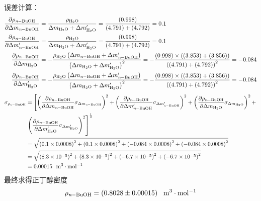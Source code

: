 \documentclass[cn,hazy,pku,12pt,normal,math=newtx,cite=super]{elegantnote}
\begin{document}
误差计算：
\begin{equation*}
\begin{aligned}
\frac{\partial \rho_{\ce{\textit{n}-BuOH}} }{\partial \Delta m_{\ce{\textit{n}-BuOH}} }&=\frac{\rho_{\ce{H_2O}}}{\Delta m_{\ce{H_2O}} + \Delta m_{\ce{H_2O}}^\prime}=\frac{\left(0.998\right)}{\left(4.791\right) + \left(4.792\right)}=0.1\\
\frac{\partial \rho_{\ce{\textit{n}-BuOH}} }{\partial \Delta m_{\ce{\textit{n}-BuOH}}^\prime }&=\frac{\rho_{\ce{H_2O}}}{\Delta m_{\ce{H_2O}} + \Delta m_{\ce{H_2O}}^\prime}=\frac{\left(0.998\right)}{\left(4.791\right) + \left(4.792\right)}=0.1\\
\frac{\partial \rho_{\ce{\textit{n}-BuOH}} }{\partial \Delta m_{\ce{H_2O}} }&=- \frac{\rho_{\ce{H_2O}} \left(\Delta m_{\ce{\textit{n}-BuOH}} + \Delta m_{\ce{\textit{n}-BuOH}}^\prime\right)}{\left(\Delta m_{\ce{H_2O}} + \Delta m_{\ce{H_2O}}^\prime\right)^{2}}=- \frac{\left(0.998\right) \times \left(\left(3.853\right) + \left(3.856\right)\right)}{\left(\left(4.791\right) + \left(4.792\right)\right)^{2}}=-0.084\\
\frac{\partial \rho_{\ce{\textit{n}-BuOH}} }{\partial \Delta m_{\ce{H_2O}}^\prime }&=- \frac{\rho_{\ce{H_2O}} \left(\Delta m_{\ce{\textit{n}-BuOH}} + \Delta m_{\ce{\textit{n}-BuOH}}^\prime\right)}{\left(\Delta m_{\ce{H_2O}} + \Delta m_{\ce{H_2O}}^\prime\right)^{2}}=- \frac{\left(0.998\right) \times \left(\left(3.853\right) + \left(3.856\right)\right)}{\left(\left(4.791\right) + \left(4.792\right)\right)^{2}}=-0.084\\
\end{aligned}
\end{equation*}
\begin{equation*}
\begin{aligned}
\sigma_{\rho_{\ce{\textit{n}-BuOH}}}&=\left[\left(\frac{\partial \rho_{\ce{\textit{n}-BuOH}} }{\partial \Delta m_{\ce{\textit{n}-BuOH}} } \sigma_{\Delta m_{\ce{\textit{n}-BuOH}}}\right)^2+\left(\frac{\partial \rho_{\ce{\textit{n}-BuOH}} }{\partial \Delta m_{\ce{\textit{n}-BuOH}}^\prime } \sigma_{\Delta m_{\ce{\textit{n}-BuOH}}^\prime}\right)^2+\left(\frac{\partial \rho_{\ce{\textit{n}-BuOH}} }{\partial \Delta m_{\ce{H_2O}} } \sigma_{\Delta m_{\ce{H_2O}}}\right)^2+\right.\\
& \left.\left(\frac{\partial \rho_{\ce{\textit{n}-BuOH}} }{\partial \Delta m_{\ce{H_2O}}^\prime } \sigma_{\Delta m_{\ce{H_2O}}^\prime}\right)^2\right]^{\frac12}\\  
&=\sqrt{\left(0.1 \times 0.0008\right)^2+\left(0.1 \times 0.0008\right)^2+\left(-0.084 \times 0.0008\right)^2+\left(-0.084 \times 0.0008\right)^2}\\
&=\sqrt{\left(8.3 \times 10^{-5}\right)^2+\left(8.3 \times 10^{-5}\right)^2+\left(-6.7 \times 10^{-5}\right)^2+\left(-6.7 \times 10^{-5}\right)^2}\\
&=0.00015\ \mathrm{~m^3\cdot mol^{-1}}
\end{aligned}
\end{equation*}
最终求得正丁醇密度
\begin{equation*}
\rho_{\ce{\textit{n}-BuOH}}=\left (0.8028 \pm 0.00015 \right )\ \mathrm{~m^3\cdot mol^{-1}}
\end{equation*}
\end{document}
